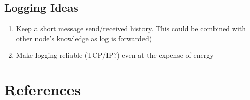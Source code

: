 \documentclass[a4paper,notitlepage]{article}
\begin{document}
\subsection{Logging Ideas}
\begin{enumerate}
	\item Keep a short message send/received history. This could be combined with other node's knowledge as log is forwarded)
	\item Make logging reliable (TCP/IP?) even at the expense of energy
\end{enumerate}


\clearpage



\clearpage



\clearpage

\appendixpage
\addappheadtotoc
\appendix



\newpage

\section{References}
\renewcommand{\refname}{\vspace{-1cm}}


\end{document}

